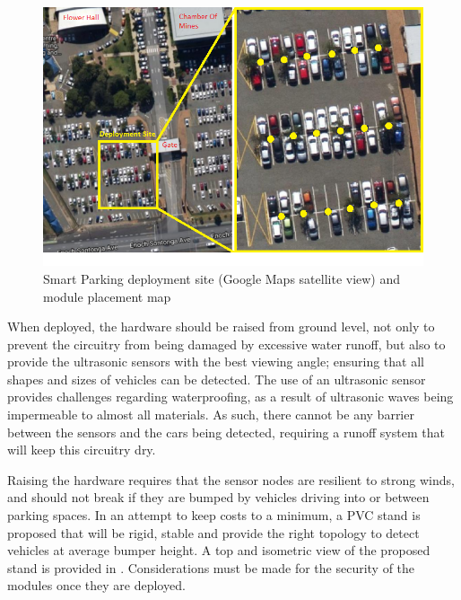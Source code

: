 \documentclass[10pt,twocolumn]{witseiepaper}
\begin{document}
		\begin{figure}
			\centering
			\includegraphics[width=1\columnwidth]{media/deploymentSite.png}
			\caption{Smart Parking deployment site (Google Maps satellite view) and module placement map}
			\raggedright
			\label{fig:deployment}
		\end{figure}
	
		When deployed, the hardware should be raised from ground level, not only to prevent the circuitry from being damaged by excessive water runoff, but also to provide the ultrasonic sensors with the best viewing angle; ensuring that all shapes and sizes of vehicles can be detected. The use of an ultrasonic sensor provides challenges regarding waterproofing, as a result of ultrasonic waves being impermeable to almost all materials. As such, there cannot be any barrier between the sensors and the cars being detected, requiring a runoff system that will keep this circuitry dry. 
		
		Raising the hardware requires that the sensor nodes are resilient to strong winds, and should not break if they are bumped by vehicles driving into or between parking spaces. In an attempt to keep costs to a minimum, a PVC stand is proposed that will be rigid, stable and provide the right topology to detect vehicles at average bumper height. A top and isometric view of the proposed stand is provided in . Considerations must be made for the security of the modules once they are deployed.
		
\end{document}
